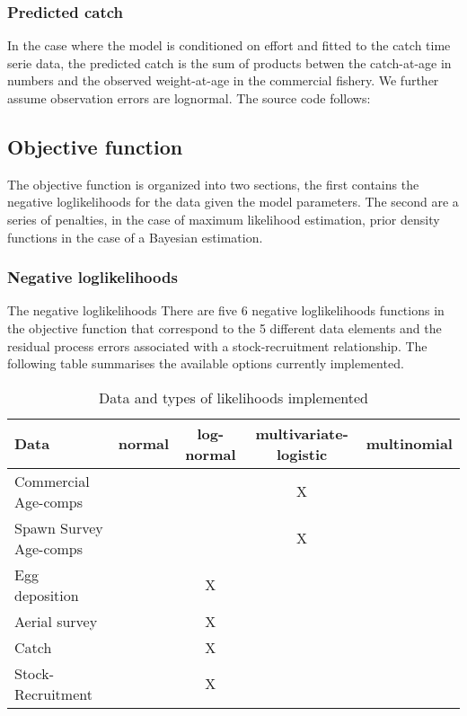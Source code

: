 \documentclass[12pt,letterpaper]{article}
\begin{document}
    \subsubsection{Predicted catch} %
    \label{ssub:predicted_catch}
    In the case where the model is conditioned on effort and fitted to the catch time serie data, the predicted catch is the sum of products betwen the catch-at-age in numbers and the observed weight-at-age in the commercial fishery.
    We further assume observation errors are lognormal. The source code follows:
    

  \subsection{Objective function} %
  \label{sub:objective_function}
  The objective function is organized into two sections, the first contains the negative loglikelihoods for the data given the model parameters.  The second are a series of penalties, in the case of maximum likelihood estimation, prior density functions in the case of a Bayesian estimation.
    \subsubsection{Negative loglikelihoods} %
    \label{ssub:negative_loglikelihoods}
    The negative loglikelihoods 
    There are five 6 negative loglikelihoods functions in the objective function that correspond to the 5 different data elements and the residual process errors associated with a stock-recruitment relationship. The following table summarises the available options currently implemented.

    \begin{table}[h]
      \caption{Data and types of likelihoods implemented}
      \begin{tabular}{l|c|c|c|c}
        \hline
        Data & normal & log-normal & multivariate-logistic & multinomial\\
        \hline
        Commercial Age-comps & & & X\\
        Spawn Survey Age-comps & & & X\\
        Egg deposition & & X & \\
        Aerial survey & & X  & \\
        Catch  & & X & \\
        Stock-Recruitment & & X & \\
      \end{tabular}
    \end{table}
    
\end{document}
